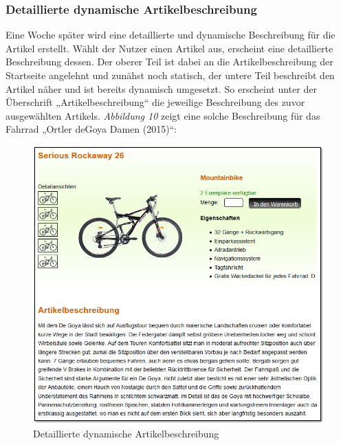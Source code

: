 \subsubsection{Detaillierte dynamische Artikelbeschreibung}

Eine Woche später wird eine detaillierte und dynamische Beschreibung für die Artikel erstellt. Wählt der Nutzer einen Artikel aus, erscheint eine detaillierte Beschreibung dessen. Der oberer Teil ist dabei an die Artikelbeschreibung der Startseite angelehnt und zunähst noch statisch, der untere Teil beschreibt den Artikel näher und ist bereits dynamisch umgesetzt. So erscheint unter der Überschrift „Artikelbeschreibung“ die jeweilige Beschreibung des zuvor ausgewählten Artikels. \textit{Abbildung 10} zeigt eine solche Beschreibung für das Fahrrad „Ortler deGoya Damen (2015)“:

\begin{figure}[H]
\begin{center}
\includegraphics[width=150mm]{Bilder/Abbildung11-DynamischeDetailierteArtikelbeschreibung.png}
\end{center}
\caption{Detaillierte dynamische Artikelbeschreibung}
\label{Abbildung11-Detaillierte dynamische Artikelbeschreibung}
\end{figure}

